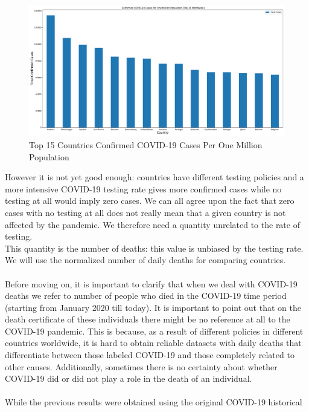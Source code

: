 \documentclass[11pt,a4paper]{article}
\begin{document}
\begin{figure}[H]
    \begin{center}
        \hspace*{-0.2cm}
        \includegraphics[scale=0.32]{img/total-cases-per-million.pdf}
    \end{center}
    \caption{Top 15 Countries Confirmed COVID-19 Cases Per One Million Population}
\end{figure}
\noindent However it is not yet good enough: countries have different testing
policies and a more intensive COVID-19 testing rate gives more confirmed cases
while no testing at all would imply zero cases. We can all agree upon the fact
that zero cases with no testing at all does not really mean that a given country
is not affected by the pandemic. We therefore need a quantity unrelated to the
rate of testing.\\
This quantity is the number of deaths: this value is unbiased by the testing
rate. We will use the normalized number of daily deaths for comparing
countries.\\
\\
Before moving on, it is important to clarify that when we deal with COVID-19
deaths we refer to number of people who died in the COVID-19 time period
(starting from January 2020 till today). It is important to point out that
on the death certificate of these individuals there might be no reference at
all to the COVID-19 pandemic. This is because, as a result of different
policies in different countries worldwide, it is hard to obtain reliable
datasets with daily deaths that differentiate between those labeled COVID-19
and those completely related to other causes. Additionally, sometimes there is
no certainty about whether COVID-19 did or did not play a role in the death of
an individual.\\
\\
While the previous results were obtained using the original COVID-19 historical
\end{document}
